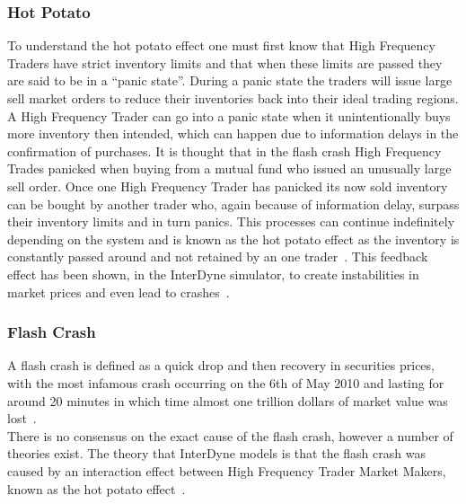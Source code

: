 \documentclass{article}
\begin{document}
\subsubsection{Hot Potato} 



To understand the hot potato effect one must first know that High Frequency Traders have strict inventory limits and that when these limits are passed they are said to be in a ``panic state''. During a panic state the traders will issue large sell market orders to reduce their inventories back into their ideal trading regions. A High Frequency Trader can go into a panic state when it unintentionally buys more inventory then intended, which can happen due to information delays in the confirmation of purchases. It is thought that in the flash crash High Frequency Trades panicked when buying from a mutual fund who issued an unusually large sell order. Once one High Frequency Trader has panicked its now sold inventory can be bought by another trader who, again because of information delay, surpass their inventory limits and in turn panics. This processes can continue indefinitely depending on the system and is known as the hot potato effect as the inventory is constantly passed around and not retained by an one trader~\cite{Elias_Paper}. This feedback effect has been shown, in the InterDyne simulator, to create instabilities in market prices and even lead to crashes~\cite{DynamicCoupling_Chris}.   






\subsubsection{Flash Crash}
 
A flash crash is defined as a quick drop and then recovery in securities prices, with the most infamous  crash occurring on the 6th of May 2010 and lasting for around 20 minutes in which time almost one trillion dollars of market value was lost~\cite{Vikram_Paper}.\\
There is no consensus on the exact cause of the flash crash, however a number of theories exist. The theory that InterDyne models is that the flash crash was caused by an interaction effect between High Frequency Trader Market Makers, known as the hot potato effect~\cite{Elias_Paper}. 
\end{document}

